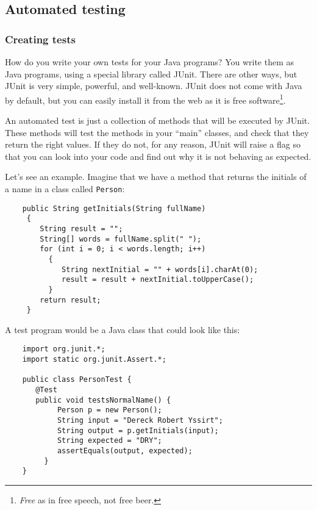 \subsection{Automated testing}
\label{sec:automated-testing}

\subsubsection{Creating tests}
\label{sec:creating-tests}

How do you write your own tests for your Java programs? You write them
as Java programs, using a special library called JUnit. There are
other ways, but JUnit is very simple, powerful, and well-known. JUnit
does not come with Java by default, but you can easily install it from
the web as it is free software\footnote{\emph{Free} as in free speech,
not free beer.}. 

An automated test is just a collection of methods that will be
executed by JUnit. These methods will test the methods in your
``main'' classes, and check that they return the right values. If they
do not, for any reason, JUnit will raise a flag so that you can look
into your code and find out why it is not behaving as expected. 

Let's see an example. Imagine that we have 
a method that returns the initials of a name
in a class called \verb+Person+: 

\begin{verbatim}
    public String getInitials(String fullName)
     {
        String result = "";
        String[] words = fullName.split(" ");
        for (int i = 0; i < words.length; i++)
          {
             String nextInitial = "" + words[i].charAt(0);
             result = result + nextInitial.toUpperCase();
          }
        return result;
     }
\end{verbatim}

A test program would be a Java class that could look like this: 

\begin{verbatim}
    import org.junit.*;
    import static org.junit.Assert.*;
    
    public class PersonTest {
       @Test
       public void testsNormalName() {
            Person p = new Person();
            String input = "Dereck Robert Yssirt";
            String output = p.getInitials(input);
            String expected = "DRY";
            assertEquals(output, expected);
         }
    }
\end{verbatim}

